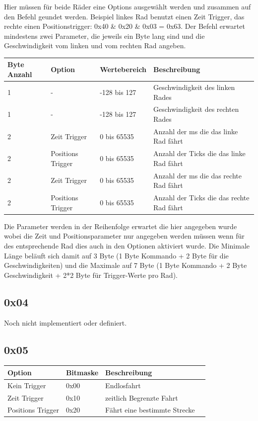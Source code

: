 \documentclass[a4paper]{article}
\begin{document}
	Hier müssen für beide Räder eine Options ausgewählt werden und zusammen auf den Befehl geundet werden. Beispiel linkes
	Rad benutzt einen Zeit Trigger, das rechte einen Positionstrigger: 0x40 \& 0x20 \& 0x03 = 0x63.
	Der Befehl erwartet mindestens zwei Parameter, die jeweils ein Byte lang sind und die Geschwindigkeit vom linken und
	vom rechten Rad angeben.

	\begin{tabularx}{\linewidth}{|l|l|l|X|}
		\hline
		\textbf{Byte Anzahl} & \textbf{Option} & \textbf{Wertebereich} & \textbf{Beschreibung} \\
		\hline
		\hline
		1					 & - & -128 bis 127 & Geschwindigkeit des linken Rades \\
		\hline
		1					 & - & -128 bis 127 & Geschwindigkeit des rechten Rades\\
		\hline
		2					 & Zeit Trigger & 0 bis 65535 &  Anzahl der ms die das linke Rad fährt\\
		\hline
		2					 & Positions Trigger & 0 bis 65535 &  Anzahl der Ticks die das linke Rad fährt\\
		\hline
		2					 & Zeit Trigger & 0 bis 65535 &  Anzahl der ms die das rechte Rad fährt\\
		\hline
		2					 & Positions Trigger & 0 bis 65535 &  Anzahl der Ticks die das rechte Rad fährt\\
		\hline
	\end{tabularx}
	
	Die Parameter werden in der Reihenfolge erwartet die hier angegeben wurde wobei die Zeit und Positionsparameter nur
	angegeben werden müssen wenn für des entsprechende Rad dies auch in den Optionen aktiviert wurde.
	Die Minimale Länge beläuft sich damit auf 3 Byte (1 Byte Kommando + 2 Byte für die Geschwindigkeiten) und die
	Maximale auf 7 Byte (1 Byte Kommando + 2 Byte Geschwindigkeit + 2*2 Byte für Trigger-Werte pro Rad).

	\subsection{0x04}

	Noch nicht implementiert oder definiert.

	\subsection{0x05}

	\begin{tabularx}{\linewidth}{|l|l|l|X|}
		\hline
		\textbf{Option} & \textbf{Bitmaske} & \textbf{Beschreibung} \\
		\hline
		\hline
		Kein Trigger	& 0x00						   & Endlosfahrt \\
		\hline
		Zeit Trigger	& 0x10						   & zeitlich Begrenzte Fahrt\\
		\hline
		Positions Trigger & 0x20						   & Fährt eine bestimmte Strecke \\
		\hline
	\end{tabularx}
	
\end{document}
